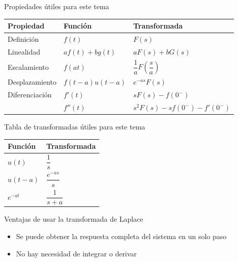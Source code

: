 \documentclass[aspectratio=169]{beamer}
\begin{document}
\begin{frame}{Propiedades útiles para este tema}
    \begin{tabularx}{\textwidth}{p{3cm}XX}
        \toprule
        Propiedad & Función & Transformada\\
        \midrule
        Definición & $f(t)$ & $F(s)$\\[12pt]
        Linealidad & $af(t)+bg(t)$ & $aF(s)+bG(s)$\\[12pt]
        Escalamiento & $f(at)$ & $\dfrac{1}{a}F(\dfrac{s}{a})$\\[12pt]
        Desplazamiento & $f(t-a)u(t-a)$ & $e^{-as}F(s)$ \\[12pt]
        Diferenciación & $f'(t)$ & $sF(s)-f(0^-)$\\[12pt]
        & $f''(t)$ & $s^2F(s)-sf(0^-)-f'(0^-)$\\[12pt]
        \bottomrule
    \end{tabularx}
\end{frame}

\begin{frame}{Tabla de transformadas útiles para este tema}
    \centering
    \begin{tabularx}{0.6\textwidth}{XX}
        \toprule
        Función & Transformada\\
        \midrule
        $u(t)$ & $\dfrac{1}{s}$\\[12pt]
        $u(t-a)$ & $\dfrac{e^{-as}}{s}$\\[12pt]
        $e^{-at}$ & $\dfrac{1}{s+a}$\\[12pt]
        \bottomrule
    \end{tabularx}
\end{frame}

\begin{frame}{Ventajas de usar la transformada de Laplace}
\begin{itemize}
    \item Se puede obtener la respuesta completa del sistema en un solo paso
    \item No hay necesidad de integrar o derivar
\end{itemize}

\end{frame}
\end{document}
